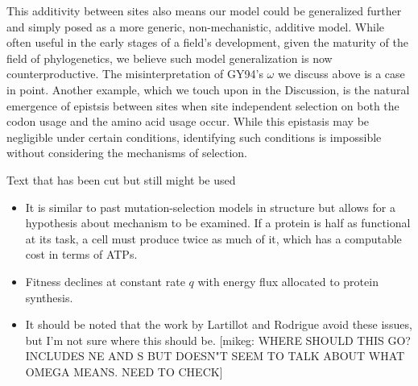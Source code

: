 \documentclass[12pt,letterpaper]{article}
\renewcommand{\subsection}[1]{%
\bigskip
\begin{center}
\begin{large}
\normalfont\itshape #1
\end{large}
\end{center}}
\begin{document}
{This additivity between sites also means our model could be generalized further and simply posed as a more generic, non-mechanistic, additive model.
While often useful in the early stages of a field's development, given the maturity of the field of phylogenetics, we believe such model generalization is now counterproductive.
The misinterpretation of GY94's $\omega$ we discuss above is a case in point.
Another example, which we touch upon in the Discussion, is the natural emergence of epistsis between sites when site independent selection on both the codon usage and the amino acid usage occur.
While this epistasis may be negligible under certain conditions, identifying such conditions is impossible without considering the mechanisms of selection.


\subsection*{Text that has been cut but still might be used}
\begin{itemize}
\item It is similar to past mutation-selection models in structure but allows for a hypothesis about mechanism to be examined.
If a protein is half as functional at its task, a cell must produce twice as much of it, which has a computable cost in terms of ATPs.

\item Fitness declines at constant rate $q$ with energy flux allocated to protein synthesis.
\item It should be noted that the work by Lartillot and Rodrigue avoid these issues, but I'm not sure where this should be.
[mikeg: WHERE SHOULD THIS GO? \citet{NielsenAndYang2003} INCLUDES NE AND S BUT DOESN"T SEEM TO TALK ABOUT WHAT OMEGA MEANS.
NEED TO CHECK]

\end{itemize}

\pagebreak
}{}
\end{document}
